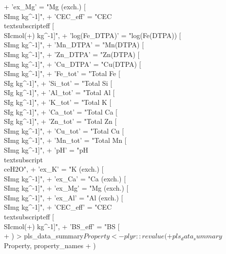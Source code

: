 \documentclass[11pt,%
  abstracton, english]
	{report}
\begin{document}
\begin{Schunk}
\begin{Sinput}
+   'ex_Mg' = "Mg (exch.) [\\SI{}{mg kg^{-1}}]",
+   'CEC_eff' = "CEC\\textsubscript{eff} [\\SI{}{cmol(+) kg^{-1}}]",
+   'log(Fe_DTPA)' = "log(Fe(DTPA)) [\\SI{}{mg kg^{-1}}]",
+   'Mn_DTPA' = "Mn(DTPA) [\\SI{}{mg kg^{-1}}]",
+   'Zn_DTPA' = "Zn(DTPA) [\\SI{}{mg kg^{-1}}]",
+   'Cu_DTPA' = "Cu(DTPA) [\\SI{}{mg kg^{-1}}]",
+   'Fe_tot' = "Total Fe [\\SI{}{g kg^{-1}}]",
+   'Si_tot' = "Total Si [\\SI{}{g kg^{-1}}]",
+   'Al_tot' = "Total Al [\\SI{}{g kg^{-1}}]",
+   'K_tot' = "Total K [\\SI{}{g kg^{-1}}]",
+   'Ca_tot' = "Total Ca [\\SI{}{g kg^{-1}}]",
+   'Zn_tot' = "Total Zn [\\SI{}{mg kg^{-1}}]",
+   'Cu_tot' = "Total Cu [\\SI{}{mg kg^{-1}}]",
+   'Mn_tot' = "Total Mn [\\SI{}{mg kg^{-1}}]",
+   'pH' = "pH\\textsubscript{\\ce{H2O}}",
+   'ex_K' = "K (exch.) [\\SI{}{mg kg^{-1}}]",
+   'ex_Ca' = "Ca (exch.) [\\SI{}{mg kg^{-1}}]",
+   'ex_Mg' = "Mg (exch.) [\\SI{}{mg kg^{-1}}]",
+   'ex_Al' = "Al (exch.) [\\SI{}{mg kg^{-1}}]",
+   'CEC_eff' = "CEC\\textsubscript{eff} [\\SI{}{cmol(+) kg^{-1}}]",
+   'BS_eff' = "BS [\\%]"
+ )
> pls_data_summary$Property <- plyr::revalue(
+   pls_data_summary$Property, property_names
+ )
\end{Sinput}
\end{Schunk}
\end{document}
